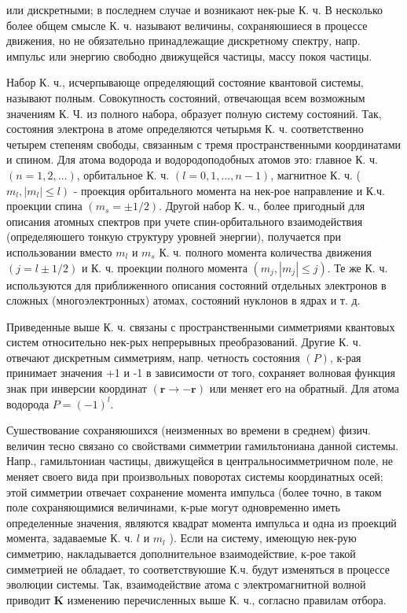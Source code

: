 \documentclass[10pt]{article}
\begin{document}
или дискретными; в последнем случае и возникают нек-рые К. ч. В несколько более общем смысле К. ч. называют величины, сохраняюшиеся в процессе движения, но не обязательно принадлежащие дискретному спектру, напр. импульс или энергию свободно движущейся частицы, массу покоя частицы.



Набор К. ч., исчерпывающе определяющий состояние квантовой системы, называют полным. Совокупность состояний, отвечающая всем возможным значениям К. Ч. из полного набора, образует полную систему состояний. Так, состояния электрона в атоме определяются четырьмя К. ч. соответственно четырем степеням свободы, связанным с тремя пространственными координатами и спином. Для атома водорода и водородоподобных атомов это: главное К. ч. $(n=1,2, \ldots)$, орбитальное К. ч. $(l=0,1, \ldots, n-1)$, магнитное К. ч. ( $\left.m_{l},\left|m_{l}\right| \leqslant l\right)$ - проекция орбитального момента на нек-рое направление и К.ч. проекции спина $\left(m_{s}= \pm 1 / 2\right)$. Другой набор К. ч., более пригодный для описания атомных спектров при учете спин-орбитального взаимодействия (определяюшего тонкую структуру уровней энергии), получается при использовании вместо $m_{l}$ и $m_{s}$ К. ч. полного момента количества движения $(j=l \pm 1 / 2)$ и К. ч. проекции полного момента $\left(m_{j},\left|m_{j}\right| \leqslant j\right)$. Те же К. ч. используются для приближенного описания состояний отдельных электронов в сложных (многоэлектронных) атомах, состояний нуклонов в ядрах и т. д.



Приведенные выше К. ч. связаны с пространственными симметриями квантовых систем относительно нек-рых непрерывных преобразований. Другие К. ч. отвечают дискретным симметриям, напр. четность состояния $(P)$, к-рая принимает значения +1 и -1 в зависимости от того, сохраняет волновая функция знак при инверсии координат $(\boldsymbol{r} \rightarrow-\boldsymbol{r})$ или меняет его на обратный. Для атома водорода $P=(-1)^{l}$.



Сушествование сохраняюшихся (неизменных во времени в среднем) физич. величин тесно связано со свойствами симметрии гамильтониана данной системы. Напр., гамильтониан частицы, движущейся в центральносимметричном поле, не меняет своего вида при произвольных поворотах системы координатных осей; этой симметрии отвечает сохранение момента импульса (более точно, в таком поле сохраняющимися величинами, к-рые могут одновременно иметь определенные значения, являются квадрат момента импульса и одна из проекций момента, задаваемые К. ч. $l$ и $m_{l}$ ). Если на систему, имеющую нек-рую симметрию, накладывается дополнительное взаимодействие, к-рое такой симметрией не обладает, то соответствуюшие К.ч. будут изменяться в процессе эволюции системы. Так, взаимодействие атома с электромагнитной волной приводит $\mathbf{K}$ изменению перечисленных выше К. ч., согласно правилам отбора.
\end{document}
